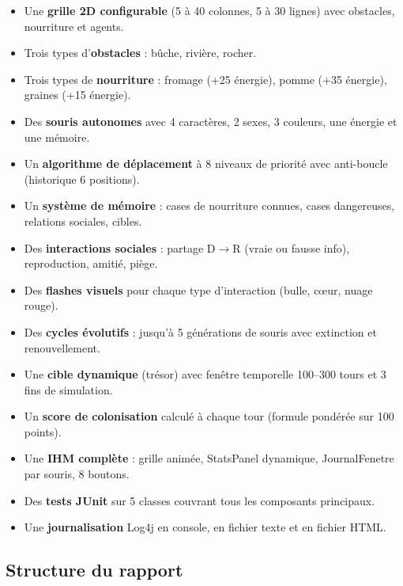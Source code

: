 \begin{itemize}
    \item Une \textbf{grille 2D configurable} (5 à 40 colonnes, 5 à 30 lignes) avec obstacles, nourriture et agents.
    \item Trois types d'\textbf{obstacles} : bûche, rivière, rocher.
    \item Trois types de \textbf{nourriture} : fromage (+25 énergie), pomme (+35 énergie), graines (+15 énergie).
    \item Des \textbf{souris autonomes} avec 4 caractères, 2 sexes, 3 couleurs, une énergie et une mémoire.
    \item Un \textbf{algorithme de déplacement} à 8 niveaux de priorité avec anti-boucle (historique 6 positions).
    \item Un \textbf{système de mémoire} : cases de nourriture connues, cases dangereuses, relations sociales, cibles.
    \item Des \textbf{interactions sociales} : partage D$\rightarrow$R (vraie ou fausse info), reproduction, amitié, piège.
    \item Des \textbf{flashes visuels} pour chaque type d'interaction (bulle, cœur, nuage rouge).
    \item Des \textbf{cycles évolutifs} : jusqu'à 5 générations de souris avec extinction et renouvellement.
    \item Une \textbf{cible dynamique} (trésor) avec fenêtre temporelle 100--300 tours et 3 fins de simulation.
    \item Un \textbf{score de colonisation} calculé à chaque tour (formule pondérée sur 100 points).
    \item Une \textbf{IHM complète} : grille animée, StatsPanel dynamique, JournalFenetre par souris, 8 boutons.
    \item Des \textbf{tests JUnit} sur 5 classes couvrant tous les composants principaux.
    \item Une \textbf{journalisation} Log4j en console, en fichier texte et en fichier HTML.
\end{itemize}

\subsection{Structure du rapport}

